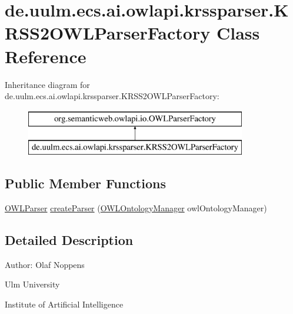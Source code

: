 \hypertarget{classde_1_1uulm_1_1ecs_1_1ai_1_1owlapi_1_1krssparser_1_1_k_r_s_s2_o_w_l_parser_factory}{\section{de.\-uulm.\-ecs.\-ai.\-owlapi.\-krssparser.\-K\-R\-S\-S2\-O\-W\-L\-Parser\-Factory Class Reference}
\label{classde_1_1uulm_1_1ecs_1_1ai_1_1owlapi_1_1krssparser_1_1_k_r_s_s2_o_w_l_parser_factory}
}
Inheritance diagram for de.\-uulm.\-ecs.\-ai.\-owlapi.\-krssparser.\-K\-R\-S\-S2\-O\-W\-L\-Parser\-Factory\-:\begin{figure}[H]
\begin{center}
\leavevmode
\includegraphics[height=2.000000cm]{classde_1_1uulm_1_1ecs_1_1ai_1_1owlapi_1_1krssparser_1_1_k_r_s_s2_o_w_l_parser_factory}
\end{center}
\end{figure}
\subsection*{Public Member Functions}
\begin{DoxyCompactItemize}
\item 
\hyperlink{interfaceorg_1_1semanticweb_1_1owlapi_1_1io_1_1_o_w_l_parser}{O\-W\-L\-Parser} \hyperlink{classde_1_1uulm_1_1ecs_1_1ai_1_1owlapi_1_1krssparser_1_1_k_r_s_s2_o_w_l_parser_factory_a7be140fa4858d0ecca1dd57523e0e201}{create\-Parser} (\hyperlink{interfaceorg_1_1semanticweb_1_1owlapi_1_1model_1_1_o_w_l_ontology_manager}{O\-W\-L\-Ontology\-Manager} owl\-Ontology\-Manager)
\end{DoxyCompactItemize}


\subsection{Detailed Description}
Author\-: Olaf Noppens\par
 Ulm University\par
 Institute of Artificial Intelligence\par
 

